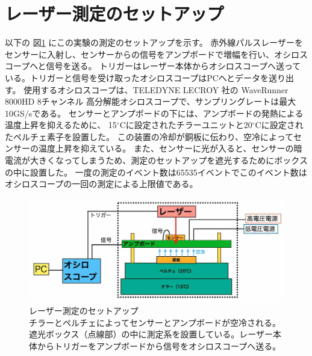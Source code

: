 \section{レーザー測定のセットアップ}

以下の 図\ref{fg:Laser_setup} にこの実験の測定のセットアップを示す。
赤外線パルスレーザーをセンサーに入射し、センサーからの信号をアンプボードで増幅を行い、オシロスコープへと信号を送る。
トリガーはレーザー本体からオシロスコープへ送っている。トリガーと信号を受け取ったオシロスコープはPCへとデータを送り出す。
使用するオシロスコープは、TELEDYNE LECROY 社の WaveRunner 8000HD 8チャンネル 高分解能オシロスコープで、サンプリングレートは最大10GS/sである。
センサーとアンプボードの下には、アンプボードの発熱による温度上昇を抑えるために、
15${}^\circ$Cに設定されたチラーユニットと20${}^\circ$Cに設定されたペルチェ素子を設置した。
この装置の冷却が銅板に伝わり、空冷によってセンサーの温度上昇を抑えている。
また、センサーに光が入ると、センサーの暗電流が大きくなってしまうため、測定のセットアップを遮光するためにボックスの中に設置した。
一度の測定のイベント数は65535イベントでこのイベント数はオシロスコープの一回の測定による上限値である。

\begin{figure}[h]
    \centering
    \includegraphics[width=14cm]{fig/ch4/Laser_setup.jpg}
    \caption[レーザー測定のセットアップ]{レーザー測定のセットアップ\\チラーとペルチェによってセンサーとアンプボードが空冷される。遮光ボックス（点線部）の中に測定系を設置している。レーザー本体からトリガーをアンプボードから信号をオシロスコープへ送る。}
    \label{fg:Laser_setup}
\end{figure}
